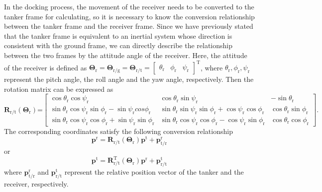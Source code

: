 In the docking process, the movement of the receiver needs to be converted
to the tanker frame for calculating, so it is necessary to know the
conversion relationship between the tanker frame and the receiver
frame. Since we have previously stated that the tanker frame is equivalent
to an inertial system whose direction is consistent with the ground
frame, we can directly describe the relationship between the two frames
by the attitude angle of the receiver. Here, the attitude of the receiver
is defined as ${{\mathbf{\Theta}}_{\text{r}}}={{\mathbf{\Theta}}_{\text{r/g}}}={{\mathbf{\Theta}}_{\text{r/t}}}=\left[\begin{array}{ccc}
{\theta}_{\text{r}} & {\phi}_{\text{r}} & {\psi}_{\text{r}}\end{array}\right]^{\text{T}}$, where ${{\theta}_{\text{r}}},{{\phi}_{\text{r}}},{{\psi}_{\text{r}}}$
represent the pitch angle, the roll angle and the yaw angle, respectively.
Then the rotation matrix can be expressed as
\begin{equation}
{{\mathbf{R}}_{\text{r/t}}}\left({{\mathbf{\Theta}}_{\text{r}}}\right)\text{=}\left[\begin{array}{ccc}
\cos{{\theta}_{\text{r}}}\cos{{\psi}_{\text{r}}} & \cos{{\theta}_{\text{r}}}\sin{{\psi}_{\text{r}}} & -\sin{{\theta}_{\text{r}}}\\
\sin{{\theta}_{\text{r}}}\cos{{\psi}_{\text{r}}}\sin{{\phi}_{\text{r}}}-\sin{{\psi}_{\text{r}}}cos{{\phi}_{\text{r}}} & \sin{{\theta}_{\text{r}}}\sin{{\psi}_{\text{r}}}\sin{{\phi}_{\text{r}}}+\cos{{\psi}_{\text{r}}}\cos{{\phi}_{\text{r}}} & \cos{{\theta}_{\text{r}}}\sin{{\phi}_{\text{r}}}\\
\sin{{\theta}_{\text{r}}}\cos{{\psi}_{\text{r}}}\cos{{\phi}_{\text{r}}}+\sin{{\psi}_{\text{r}}}\sin{{\phi}_{\text{r}}} & \sin{{\theta}_{\text{r}}}\cos{{\psi}_{\text{r}}}\cos{{\phi}_{\text{r}}}-\cos{{\psi}_{\text{r}}}\sin{{\phi}_{\text{r}}} & \cos{{\theta}_{\text{r}}}\cos{{\phi}_{\text{r}}}
\end{array}\right].\label{eq:2.14}
\end{equation}
The corresponding coordinates satisfy the following conversion relationship
\begin{equation}
{{\mathbf{p}}^{\text{r}}}={{\mathbf{R}}_{\text{r/t}}}\left({{\mathbf{\Theta}}_{\text{r}}}\right){{\mathbf{p}}^{\text{t}}}+\mathbf{p}_{\text{t/r}}^{\text{r}}\label{eq:2.15}
\end{equation}
or
\begin{equation}
{{\mathbf{p}}^{\text{t}}}=\mathbf{R}_{\text{r/t}}^{\text{T}}\left({{\mathbf{\Theta}}_{\text{r}}}\right){{\mathbf{p}}^{\text{r}}}+\mathbf{p}_{\text{r/t}}^{\text{t}}\label{eq:2.16}
\end{equation}
where $\mathbf{p}_{\text{t/r}}^{\text{r}}$ and $\mathbf{p}_{\text{r/t}}^{\text{t}}$
represent the relative position vector of the tanker and the receiver,
respectively.

